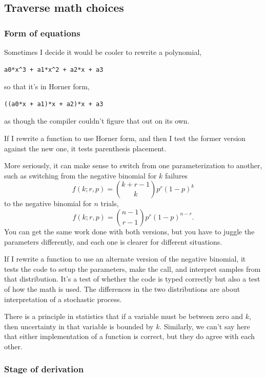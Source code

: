 \documentclass[fleqn,10pt]{olplainarticle}
\begin{document}
\subsection{Traverse math choices}

\subsubsection{Form of equations}
Sometimes I decide it would be cooler to rewrite a polynomial,
\begin{lstlisting}
a0*x^3 + a1*x^2 + a2*x + a3
\end{lstlisting}
so that it's in Horner form,
\begin{lstlisting}
((a0*x + a1)*x + a2)*x + a3
\end{lstlisting}
as though the compiler couldn't figure that out on its own.

If I rewrite a function to use Horner form, and then I test
the former version against the new one, it tests parenthesis
placement.

More seriously, it can make sense to switch from one parameterization
to another, such as switching from the negative binomial for
$k$ failures
\begin{equation}
f(k;r,p) = \genfrac(){0pt}{2}{k+r-1}{k}p^r(1-p)^k
\end{equation}
to the negative binomial for $n$ trials,
\begin{equation}
f(k;r,p) = \genfrac(){0pt}{2}{n-1}{r-1}p^r(1-p)^{n-r}.
\end{equation}
You can get the same work done with both versions, but you have to
juggle the parameters differently, and each one is clearer for
different situations.

If I rewrite a function to use an alternate version of the
negative binomial, it tests the code to setup the parameters,
make the call, and interpret samples from that distribution.
It's a test of whether the code is typed correctly but also
a test of how the math is used. The differences in the two
distributions are about interpretation of a stochastic process.

There is a principle in statistics that if a variable must
be between zero and $k$, then uncertainty in that variable is bounded
by $k$. Similarly, we can't say here that either implementation
of a function is correct, but they do agree with each other.


\subsubsection{Stage of derivation}
\end{document}
